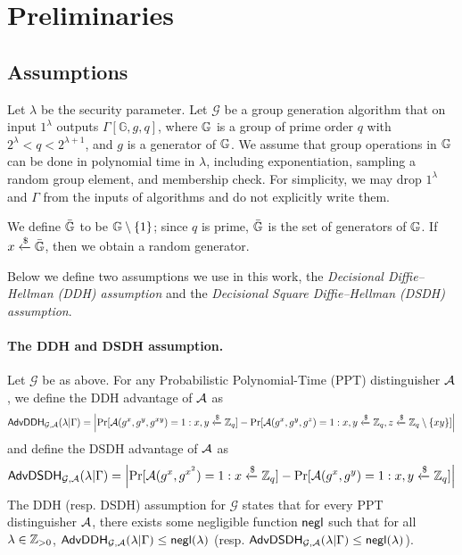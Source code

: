 \section{Preliminaries}

\subsection{Assumptions}

Let $\lambda$ be the security parameter. Let $\mathcal{G}$ be a group generation algorithm that on input $1^\lambda$ outputs $\Gamma[\mathbb{G}, g, q]$, where $\mathbb{G}$ is a group of prime order $q$ with $2^\lambda < q < 2^{\lambda+1}$, and $g$ is a generator of $\mathbb{G}$. We assume that group operations in $\mathbb{G}$ can be done in polynomial time in $\lambda$, including exponentiation, sampling a random group element, and membership check. For simplicity, we may drop $1^\lambda$ and $\Gamma$ from the inputs of algorithms and do not explicitly write them.

We define $\bar{\mathbb{G}}$ to be $\mathbb{G}\setminus\{1\}$; since $q$ is prime, $\bar{\mathbb{G}}$ is the set of generators of $\mathbb{G}$. If $x\xleftarrow{\$}\bar{\mathbb{G}}$, then we obtain a random generator.

Below we define two assumptions we use in this work, the \emph{Decisional Diffie--Hellman (DDH) assumption} and the \emph{Decisional Square Diffie--Hellman (DSDH) assumption}.

\paragraph{The DDH and DSDH assumption.}
Let $\mathcal{G}$ be as above. For any Probabilistic Polynomial-Time (PPT) distinguisher $\mathcal{A}$, we define the DDH advantage of $\mathcal{A}$ as
\begin{equation*}
	\mathsf{AdvDDH}_{\mathcal{G},\mathcal{A}}(\lambda | \Gamma) = \left|\Pr[\mathcal{A}(g^x,g^y,g^{xy}) = 1 : x,y\xleftarrow{\$}\mathbb{Z}_q] - \Pr[\mathcal{A}(g^x,g^y,g^z) = 1 : x,y\xleftarrow{\$}\mathbb{Z}_q, z\xleftarrow{\$}\mathbb{Z}_q\setminus\{xy\}]\right|
\end{equation*}
and define the DSDH advantage of $\mathcal{A}$ as
\begin{equation*}
	\mathsf{AdvDSDH}_{\mathcal{G},\mathcal{A}}(\lambda | \Gamma) = \left|\Pr[\mathcal{A}(g^x,g^{x^2}) = 1 : x\xleftarrow{\$}\mathbb{Z}_q] - \Pr[\mathcal{A}(g^x,g^y) = 1 : x,y\xleftarrow{\$}\mathbb{Z}_q]\right|
\end{equation*}
The DDH (resp. DSDH) assumption for $\mathcal{G}$ states that for every PPT distinguisher $\mathcal{A}$, there exists some negligible function $\mathsf{negl}$ such that for all $\lambda\in\mathbb{Z}_{> 0}$, $\mathsf{AdvDDH}_{\mathcal{G},\mathcal{A}}(\lambda | \Gamma)\leq\mathsf{negl}(\lambda)$ (resp. $\mathsf{AdvDSDH}_{\mathcal{G},\mathcal{A}}(\lambda | \Gamma)\leq\mathsf{negl}(\lambda)$).

